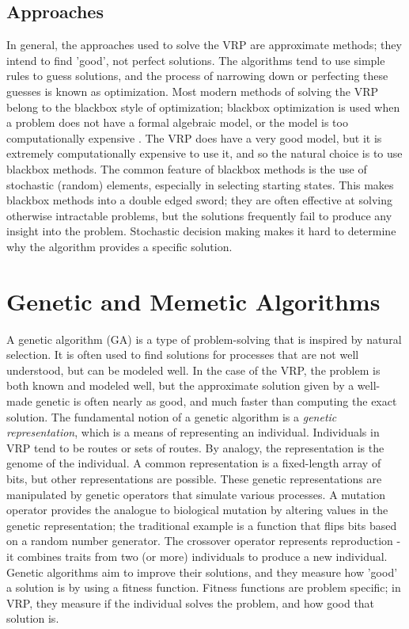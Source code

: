 \documentclass{sig-alternate}
\begin{document}
\subsection{Approaches}
In general, the approaches used to solve the VRP are approximate methods; they intend to find 'good', not perfect solutions. The algorithms tend to use simple rules to guess solutions, and the process of narrowing down or perfecting these guesses is known as optimization. Most modern methods of solving the VRP belong to the blackbox style of optimization; blackbox optimization is used when a problem does not have a formal algebraic model, or the model is too computationally expensive \cite{Amaran:2014}. The VRP does have a very good model, but it is extremely computationally expensive to use it, and so the natural choice is to use blackbox methods. The common feature of blackbox methods is the use of stochastic (random) elements, especially in selecting starting states. This makes blackbox methods into a double edged sword; they are often effective at solving otherwise intractable problems, but the solutions frequently fail to produce any insight into the problem. Stochastic decision making makes it hard to determine why the algorithm provides a specific solution. 

\section{Genetic and Memetic Algorithms}
A genetic algorithm (GA) is a type of problem-solving that is inspired by natural selection. It is often used to find solutions for processes that are not well understood, but can be modeled well. In the case of the VRP, the problem is both known and modeled well, but the approximate solution given by a well-made genetic is often nearly as good, and much faster than computing the exact solution. 
The fundamental notion of a genetic algorithm is a \textit{genetic representation}, which is a means of representing an individual. Individuals in VRP tend to be routes or sets of routes. By analogy, the representation is the genome of the individual.  A common representation is a fixed-length array of bits, but other representations are possible. These genetic representations are manipulated by genetic operators that simulate various processes. A mutation operator provides the analogue to biological mutation by altering values in the genetic representation; the traditional example is a function that flips bits based on a random number generator. The crossover operator represents reproduction - it combines traits from two (or more) individuals to produce a new individual. 
Genetic algorithms aim to improve their solutions, and they measure how 'good' a solution is by using a fitness function. Fitness functions are problem specific; in VRP, they measure if the individual solves the problem, and how good that solution is.
\end{document}
